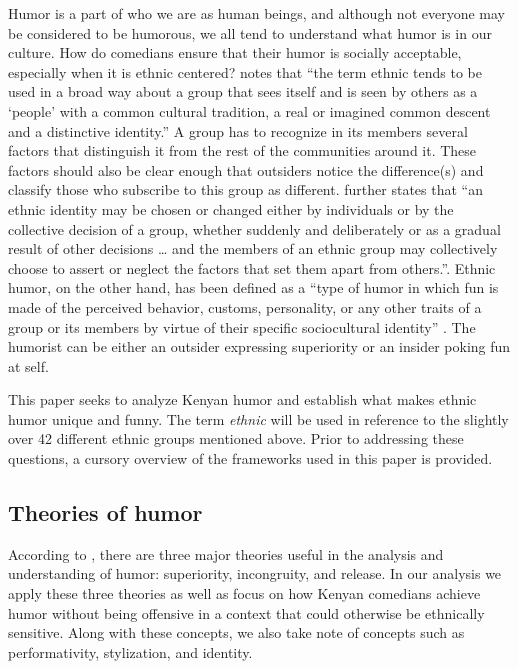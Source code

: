 \documentclass[output=paper]{langsci/langscibook}
\begin{document}
Humor is a part of who we are as human beings, and although not everyone may be considered to be humorous, we all tend to understand what humor is in our culture. How do comedians ensure that their humor is socially acceptable, especially when it is ethnic centered? \citet[1]{Davies1990} notes that “the term ethnic tends to be used in a broad way about a group that sees itself and is seen by others as a ‘people’ with a common cultural tradition, a real or imagined common descent and a distinctive identity.” A group has to recognize in its members several factors that distinguish it from the rest of the communities around it. These factors should also be clear enough that outsiders notice the difference(s) and classify those who subscribe to this group as different. \citet[1]{Davies1990} further states that “an ethnic identity may be chosen or changed either by individuals or by the collective decision of a group, whether suddenly and deliberately or as a gradual result of other decisions … and the members of an ethnic group may collectively choose to assert or neglect the factors that set them apart from others.”. Ethnic humor, on the other hand, has been defined as a “type of humor in which fun is made of the perceived behavior, customs, personality, or any other traits of a group or its members by virtue of their specific sociocultural identity” \citep[108]{Apte1985}. The humorist can be either an outsider expressing superiority or an insider poking fun at self. 

This paper seeks to analyze Kenyan humor and establish what makes ethnic humor unique and funny. The term \textit{ethnic} will be used in reference to the slightly over 42 different ethnic groups mentioned above. Prior to addressing these questions, a cursory overview of the frameworks used in this paper is provided. 

\subsection{Theories of humor}

According to \citet{Raskin1985}, there are three major theories useful in the analysis and understanding of humor: superiority, incongruity, and release. In our analysis we apply these three theories as well as focus on how Kenyan comedians achieve humor without being offensive in a context that could otherwise be ethnically sensitive. Along with these concepts, we also take note of concepts such as performativity, stylization, and identity. 
\end{document}
